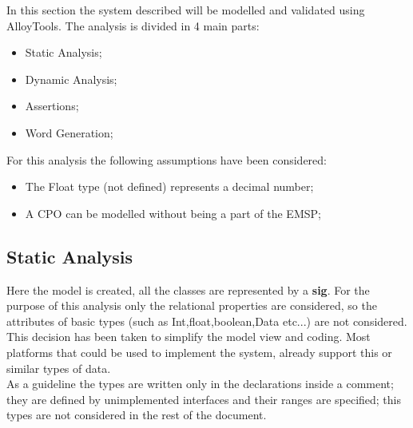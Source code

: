 In this section the system described will be modelled and validated using AlloyTools. The analysis is divided in 4 main parts:
\begin{itemize}
    \item Static Analysis;
    \item Dynamic Analysis;
    \item Assertions;
    \item Word Generation;
\end{itemize}
For this analysis the following assumptions have been considered:
\begin{itemize}
    \item The Float type (not defined) represents a decimal number;
    \item A \ac{CPO} can be modelled without being a part of the \ac{EMSP};
\end{itemize}

\subsection{Static Analysis}
Here the model is created, all the classes are represented by a \textbf{sig}. For the purpose of this analysis only the relational properties are considered, so the attributes of basic types (such as Int,float,boolean,Data etc...) are not considered.
This decision has been taken to simplify the model view and coding. Most platforms that could be used to implement the system, already support this or similar types of data.\\
As a guideline the types are written only in the declarations inside a comment; they are defined by unimplemented interfaces and their ranges are specified; this types are not considered in the rest of the document.

